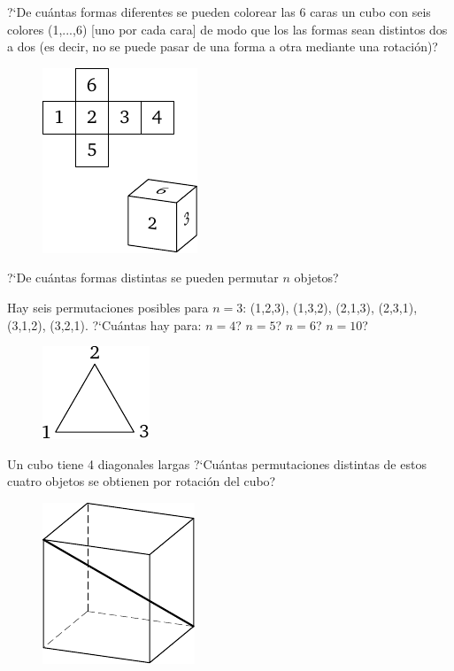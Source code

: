 \documentclass[12pt]{article}  %
\begin{document}
\newpage
{} ?`De cu\'antas formas diferentes se pueden colorear las 6 caras un cubo con seis colores (1,...,6) [uno por cada cara]
de modo que los las formas sean distintos dos a dos (es decir, no se puede pasar de una forma a otra mediante una rotaci\'on)? 
\begin{figure}[h]
\centering
\includegraphics{taskbook-17}
\end{figure}


 ?`De cu\'antas formas distintas se pueden permutar $n$ objetos?

Hay seis permutaciones posibles para $n=3$: (1,2,3), (1,3,2), (2,1,3), (2,3,1), (3,1,2), (3,2,1). ?`Cu\'antas hay para: $n=4$? $n=5$? $n=6$? $n=10$?
\begin{figure}[h]
\centering
\includegraphics{taskbook-18}
\end{figure}

 Un cubo tiene 4 diagonales largas ?`Cu\'antas permutaciones distintas de estos cuatro objetos se obtienen por rotaci\'on del cubo?
\begin{figure}[h]
\centering
\includegraphics{taskbook-19}
\end{figure}
\end{document}
